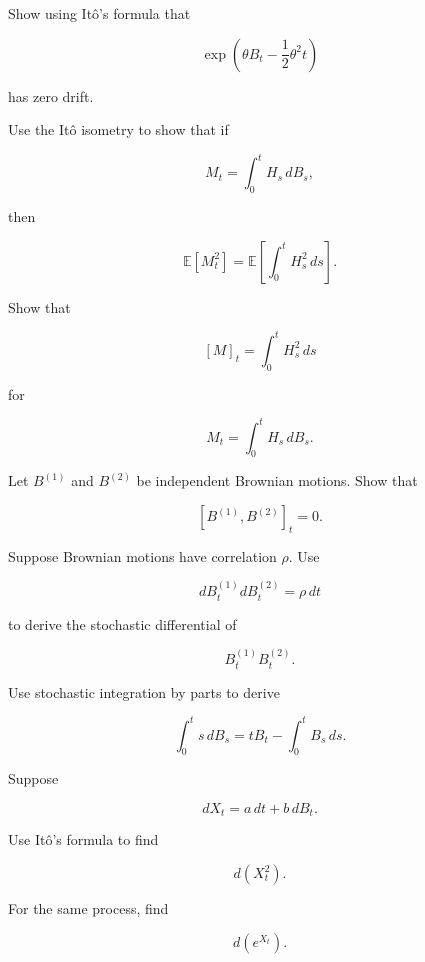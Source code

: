 \begin{exercise}[3]
Show using It\^o's formula that

\[
\exp
\left(
\theta B_t-\frac12\theta^2t
\right)
\]

has zero drift.
\end{exercise}

\begin{exercise}[3]
Use the It\^o isometry to show that if

\[
M_t
=
\int_0^t
H_s\,dB_s,
\]

then

\[
\mathbb{E}[M_t^2]
=
\mathbb{E}
\left[
\int_0^t
H_s^2\,ds
\right].
\]
\end{exercise}

\begin{exercise}[3]
Show that

\[
[M]_t
=
\int_0^t
H_s^2\,ds
\]

for

\[
M_t
=
\int_0^t
H_s\,dB_s.
\]
\end{exercise}

\begin{exercise}[3]
Let \(B^{(1)}\) and \(B^{(2)}\) be independent Brownian motions. Show
that

\[
[B^{(1)},B^{(2)}]_t=0.
\]
\end{exercise}

\begin{exercise}[3]
Suppose Brownian motions have correlation \(\rho\). Use

\[
dB_t^{(1)}dB_t^{(2)}
=
\rho\,dt
\]

to derive the stochastic differential of

\[
B_t^{(1)}B_t^{(2)}.
\]
\end{exercise}

\begin{exercise}[3]
Use stochastic integration by parts to derive

\[
\int_0^t
s\,dB_s
=
tB_t
-
\int_0^t
B_s\,ds.
\]
\end{exercise}

\begin{exercise}[3]
Suppose

\[
dX_t
=
a\,dt+b\,dB_t.
\]

Use It\^o's formula to find

\[
d(X_t^2).
\]
\end{exercise}

\begin{exercise}[3]
For the same process, find

\[
d(e^{X_t}).
\]
\end{exercise}


